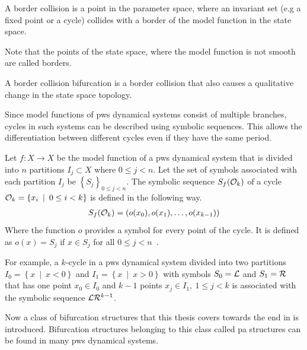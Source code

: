 \begin{definition}
	A border collision is a point in the parameter space, where an invariant set (e.g a fixed point or a cycle) collides with a border of the model function in the state space.
\end{definition}

Note that the points of the state space, where the model function is not smooth are called borders.

\begin{definition}
	A border collision bifurcation is a border collision that also causes a qualitative change in the state space topology.
\end{definition}

Since model functions of \gls{pws} dynamical systems consist of multiple branches, cycles in such systems can be described using symbolic sequences.
This allows the differentiation between different cycles even if they have the same period.

\begin{definition}
	Let $f: X \to X$ be the model function of a \gls{pws} dynamical system that is divided into $n$ partitions $I_j \subset X$ where $0 \leq j < n$.
	Let the set of symbols associated with each partition $I_j$ be $\left\{S_j\right\}_{0 \leq j < n}$.
	The symbolic sequence $S_f(\mathcal{O}_k)$ of a cycle $\mathcal{O}_k = \left\{x_i \:\mid\: 0 \leq i < k\right\}$ is defined in the following way.
	\begin{align}
		S_f(\mathcal{O}_k) = \left(o(x_0), o(x_1), \dots, o(x_{k-1})\right)
	\end{align}
	Where the function $o$ provides a symbol for every point of the cycle.
	It is defined as $o(x) = S_j$ if $x \in S_j$ for all $0 \leq j < n$~\cite{granados14adding}.
\end{definition}

For example, a $k$-cycle in a \gls{pws} dynamical system divided into two partitions $I_0 = \left\{x \:\mid\: x < 0\right\}$ and $I_1 = \left\{x \:\mid\: x > 0\right\}$ with symbols $S_0 = \mathcal{L}$ and $S_1 = \mathcal{R}$ that has one point $x_0 \in I_0$ and $k-1$ points $x_j \in I_1, \:1 \leq j < k$ is associated with the symbolic sequence $\mathcal{L}\mathcal{R}^{k-1}$.

Now a class of bifurcation structures that this thesis covers towards the end in  is introduced.
Bifurcation structures belonging to this class called \gls{pa} structures can be found in many \gls{pws} dynamical systems.


